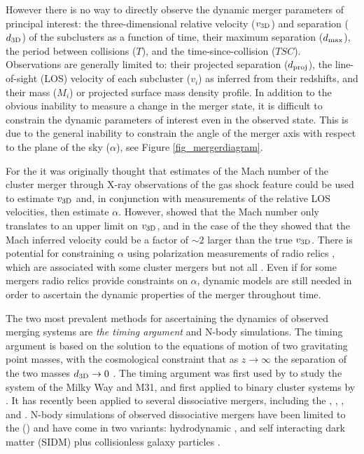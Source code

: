 \documentclass[12pt]{emulateapj}
\begin{document}
However there is no way to directly observe the dynamic merger parameters of principal interest: the three-dimensional relative velocity ($v_{\rm 3D}$) and separation ($d_{\rm 3D}$) of the subclusters as a function of time, their maximum separation ($d_{\rm max}$), the period between collisions ($T$), and the time-since-collision ($TSC$).
Observations are generally limited to: their projected separation ($d_{\rm proj}$), the line-of-sight (LOS) velocity of each subcluster ($v_i$) as inferred from their redshifts, and their mass ($M_i$) or projected surface mass density profile.
In addition to the obvious inability to measure a change in the merger state, it is difficult to constrain the dynamic parameters of interest even in the observed state. This is due to the general inability to constrain the angle of the merger axis with respect to the plane of the sky ($\alpha$), see Figure \ref{fig_mergerdiagram}.

For the  it was originally thought that estimates of the Mach number of the cluster merger through X-ray observations of the gas shock feature \citep[e.g.][]{Markevitch:2006wv} could be used to estimate $v_{\rm 3D}$ and, in conjunction with measurements of the relative LOS velocities, then estimate $\alpha$.
However, \citet{Springel:2007bg} showed that the Mach number only translates to an upper limit on $v_{\rm 3D}$, and in the case of the  they showed that the Mach inferred velocity could be a factor of $\sim2$ larger than the true $v_{\rm 3D}$.
There is potential for constraining $\alpha$ using polarization measurements of radio relics \citep{Ensslin:1998tx}, which are associated with some cluster mergers \citep[e.g.\,][]{vanWeeren:2010dn} but not all \citep[e.g.\,][]{Russell:2011hn}. 
Even if for some mergers radio relics provide constraints on $\alpha$, dynamic models are still needed in order to ascertain the dynamic properties of the merger throughout time.

The two most prevalent methods for ascertaining the dynamics of observed merging systems are \emph{the timing argument} and N-body simulations.  
The timing argument is based on the solution to the equations of motion of two gravitating point masses, with the cosmological constraint that as $z \rightarrow \infty$ the separation of the two masses $d_{\rm 3D} \rightarrow 0$ \citep[for an exposition of this method see][]{Peebles:1993vp}.  The timing argument was first used by \citet{Kahn:1959ds} to study the system of the Milky Way and M31, and first applied to binary cluster systems by \citet{Beers:1982dp}.
It has recently been applied to several dissociative mergers, including the  \citep{Barrena:2002dj},  \citep{Girardi:2008gu},   \citep{Bourdin:2011gr}, and   \citep{Boschin:2012he}.
N-body simulations of observed dissociative mergers have been limited to the  () and have come in two variants: hydrodynamic \citep{Springel:2007bg, Milosavljevic:2007hf, Mastropietro:2008fs}, and self interacting dark matter (SIDM) plus collisionless galaxy particles \citep{Randall:2008hs}.
\end{document}
